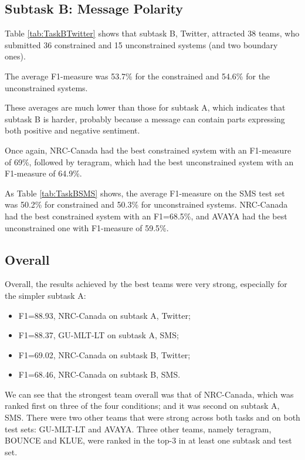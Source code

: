 \subsection{Subtask B: Message Polarity}

Table \ref{tab:TaskBTwitter} shows that subtask B, Twitter,
attracted 38 teams, who submitted 36 constrained and 15 unconstrained systems (and two boundary ones).

The average F1-measure was 53.7\% for the constrained and 54.6\% for the unconstrained systems.

These averages are much lower than those for subtask A,
which indicates that subtask B is harder,
probably because a message can contain parts expressing both positive and negative sentiment.

Once again, NRC-Canada had the best constrained system with an F1-measure of 69\%, followed by teragram, which had the best unconstrained system with an F1-measure of 64.9\%.

As Table \ref{tab:TaskBSMS} shows,
the average F1-measure on the SMS test set was 50.2\% for constrained and 50.3\% for unconstrained systems.
NRC-Canada had the best constrained system with an F1=68.5\%, and AVAYA had the best unconstrained one with F1-measure of 59.5\%.



\subsection{Overall}

Overall, the results achieved by the best teams were very strong, especially for the simpler subtask A:

\begin{itemize}
    \item F1=88.93, NRC-Canada on subtask A, Twitter;
    \item F1=88.37, GU-MLT-LT on subtask A, SMS;
    \item F1=69.02, NRC-Canada on subtask B, Twitter;
    \item F1=68.46, NRC-Canada on subtask B, SMS.
\end{itemize}

We can see that the strongest team overall was that of NRC-Canada, which was ranked first on three of the four conditions;
and it was second on subtask A, SMS.
There were two other teams that were strong across both tasks and on both test sets: GU-MLT-LT and AVAYA.
Three other teams, namely teragram, BOUNCE and KLUE, were ranked in the top-3 in at least one subtask and test set.
